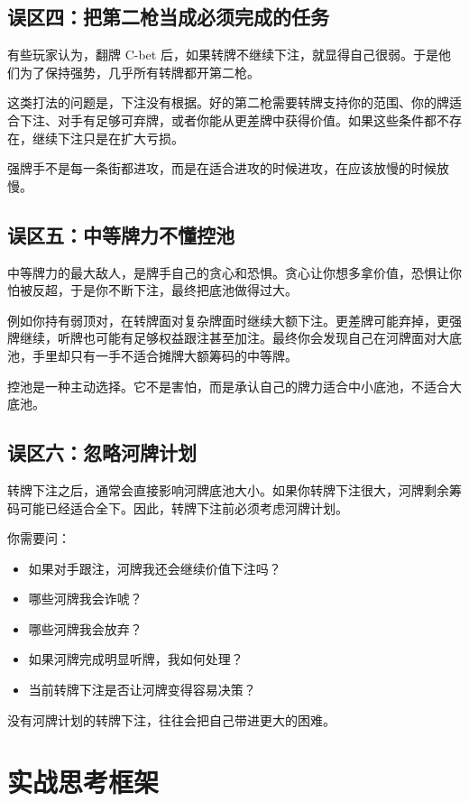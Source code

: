 \subsection{误区四：把第二枪当成必须完成的任务}

有些玩家认为，翻牌 C-bet 后，如果转牌不继续下注，就显得自己很弱。于是他们为了保持强势，几乎所有转牌都开第二枪。

这类打法的问题是，下注没有根据。好的第二枪需要转牌支持你的范围、你的牌适合下注、对手有足够可弃牌，或者你能从更差牌中获得价值。如果这些条件都不存在，继续下注只是在扩大亏损。

强牌手不是每一条街都进攻，而是在适合进攻的时候进攻，在应该放慢的时候放慢。

\subsection{误区五：中等牌力不懂控池}

中等牌力的最大敌人，是牌手自己的贪心和恐惧。贪心让你想多拿价值，恐惧让你怕被反超，于是你不断下注，最终把底池做得过大。

例如你持有弱顶对，在转牌面对复杂牌面时继续大额下注。更差牌可能弃掉，更强牌继续，听牌也可能有足够权益跟注甚至加注。最终你会发现自己在河牌面对大底池，手里却只有一手不适合摊牌大额筹码的中等牌。

控池是一种主动选择。它不是害怕，而是承认自己的牌力适合中小底池，不适合大底池。

\subsection{误区六：忽略河牌计划}

转牌下注之后，通常会直接影响河牌底池大小。如果你转牌下注很大，河牌剩余筹码可能已经适合全下。因此，转牌下注前必须考虑河牌计划。

你需要问：

\begin{itemize}
\item 如果对手跟注，河牌我还会继续价值下注吗？
\item 哪些河牌我会诈唬？
\item 哪些河牌我会放弃？
\item 如果河牌完成明显听牌，我如何处理？
\item 当前转牌下注是否让河牌变得容易决策？
\end{itemize}

没有河牌计划的转牌下注，往往会把自己带进更大的困难。

\section{实战思考框架}

